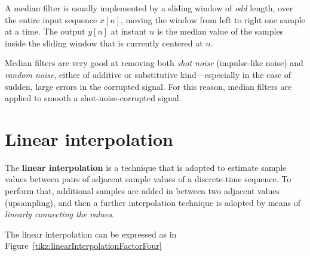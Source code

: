 \documentclass[\documentfontsize, twocolumn]{\classname}
\begin{document}
A median filter is usually implemented by a sliding window of \emph{odd} length, over the entire input sequence $x[n]$, moving the window from left to right one sample at a time. The output $y[n]$ at instant $n$ is the median value of the samples inside the sliding window that is currently centered at $n$.

Median filters are very good at removing both \emph{shot noise} (impulse-like noise) and \emph{random noise}, either of additive or substitutive kind---especially in the case of sudden, large errors in the corrupted signal. For this reason, median filters are applied to smooth a shot-noise-corrupted signal.


\section{Linear interpolation}

The \textbf{linear interpolation} is a technique that is adopted to estimate sample values between pairs of adjacent sample values of a discrete-time sequence. To perform that, additional samples are added in between two adjacent values (upsampling), and then a further interpolation technique is adopted by means of \emph{linearly connecting the values}.

The linear interpolation can be expressed as in Figure~\ref{tikz:linearInterpolationFactorFour}
\end{document}
